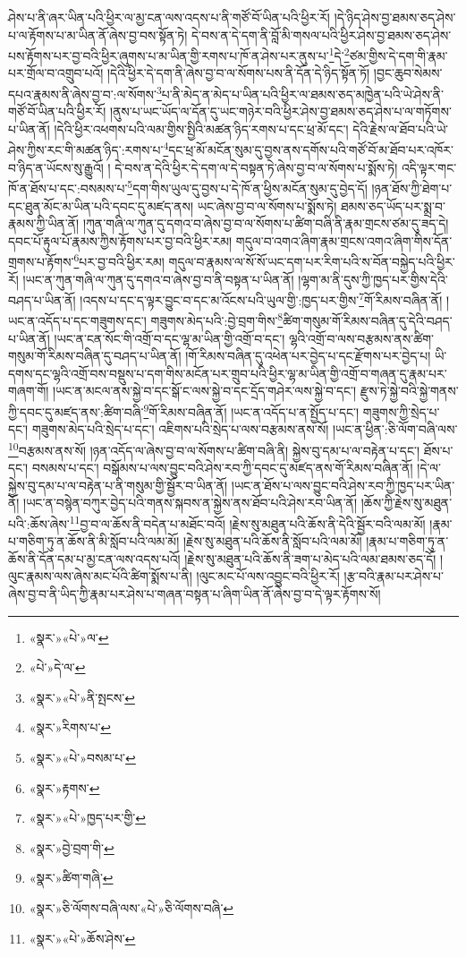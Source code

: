 ཤེས་པ་ནི་ཞར་ཡིན་པའི་ཕྱིར་ལ་མྱ་ངན་ལས་འདས་པ་ནི་གཙོ་བོ་ཡིན་པའི་ཕྱིར་རོ། །དེ་ཉིད་ཤེས་བྱ་ཐམས་ཅད་ཤེས་པ་ལ་རྟོགས་པ་མ་ཡིན་ནོ་ཞེས་བྱ་བས་སྟོན་ཏེ། དེ་བས་ན་དེ་དག་ནི་བློ་མི་གསལ་པའི་ཕྱིར་ཤེས་བྱ་ཐམས་ཅད་ཤེས་པས་རྟོགས་པར་བྱ་བའི་ཕྱིར་ཞུགས་པ་མ་ཡིན་གྱི་རགས་པ་ཁོ་ན་ཤེས་པར་ནུས་པ་\footnote{«སྣར་»«པེ་»ལ་}དེ་\footnote{«པེ་»དེ་ལ་}ཙམ་གྱིས་དེ་དག་གི་རྣམ་པར་གྲོལ་བ་འགྲུབ་པའོ། །དེའི་ཕྱིར་དེ་དག་ནི་ཞེས་བྱ་བ་ལ་སོགས་པས་ནི་དོན་དེ་ཉིད་སྟོན་ཏོ། །བྱང་ཆུབ་སེམས་དཔའ་རྣམས་ནི་ཞེས་བྱ་བ་:ལ་སོགས་\footnote{«སྣར་»«པེ་»ནི་སྤངས་}པ་ནི་མེད་ན་མེད་པ་ཡིན་པའི་ཕྱིར་ལ་ཐམས་ཅད་མཁྱེན་པའི་ཡེ་ཤེས་ནི་གཙོ་བོ་ཡིན་པའི་ཕྱིར་རོ། །ནུས་པ་ཡང་ཡོད་ལ་དོན་དུ་ཡང་གཉེར་བའི་ཕྱིར་ཤེས་བྱ་ཐམས་ཅད་ཤེས་པ་ལ་གཏོགས་པ་ཡིན་ནོ། །དེའི་ཕྱིར་འཕགས་པའི་ལམ་གྱིས་སྤྱིའི་མཚན་ཉིད་རགས་པ་དང་ཕྲ་མོ་དང་། དེའི་རྗེས་ལ་ཐོབ་པའི་ཡེ་ཤེས་ཀྱིས་རང་གི་མཚན་ཉིད་:རགས་པ་\footnote{«སྣར་»རིགས་པ་}དང་ཕྲ་མོ་མངོན་སུམ་དུ་བྱས་ནས་དགོས་པའི་གཙོ་བོ་མ་ཐོབ་པར་འཁོར་བ་ཉིད་ན་ཡོངས་སུ་རྒྱུའོ། །
དེ་བས་ན་དེའི་ཕྱིར་དེ་དག་ལ་དེ་བསྟན་ཏེ་ཞེས་བྱ་བ་ལ་སོགས་པ་སྨོས་ཏེ། འདི་ལྟར་གང་ཁོ་ན་ཐོས་པ་དང་:བསམས་པ་\footnote{«སྣར་»«པེ་»བསམ་པ་}དག་གིས་ཡུལ་དུ་བྱས་པ་དེ་ཁོ་ན་ཕྱིས་མངོན་སུམ་དུ་བྱེད་དོ། །ཉན་ཐོས་ཀྱི་ཐེག་པ་དང་ཐུན་མོང་མ་ཡིན་པའི་དབང་དུ་མཛད་ནས། ཡང་ཞེས་བྱ་བ་ལ་སོགས་པ་སྨོས་ཏེ། ཐམས་ཅད་ཡོད་པར་སྨྲ་བ་རྣམས་ཀྱི་ཡིན་ནོ། །ཀུན་གཞི་ལ་ཀུན་དུ་དགའ་བ་ཞེས་བྱ་བ་ལ་སོགས་པ་ཚིག་བཞི་ནི་རྣམ་གྲངས་ཙམ་དུ་ཟད་དེ། དབང་པོ་རྟུལ་པོ་རྣམས་ཀྱིས་རྟོགས་པར་བྱ་བའི་ཕྱིར་རམ། གདུལ་བ་འགའ་ཞིག་རྣམ་གྲངས་འགའ་ཞིག་གིས་དོན་གྲགས་པ་རྟོགས་\footnote{«སྣར་»རྟགས་}པར་བྱ་བའི་ཕྱིར་རམ། གདུལ་བ་རྣམས་ལ་སོ་སོ་ཡང་དག་པར་རིག་པའི་ས་བོན་བསྐྱེད་པའི་ཕྱིར་རོ། །ཡང་ན་ཀུན་གཞི་ལ་ཀུན་དུ་དགའ་བ་ཞེས་བྱ་བ་ནི་བསྟན་པ་ཡིན་ནོ། །ལྷག་མ་ནི་དུས་ཀྱི་ཁྱད་པར་གྱིས་དེའི་བཤད་པ་ཡིན་ནོ། །འདས་པ་དང་ད་ལྟར་བྱུང་བ་དང་མ་འོངས་པའི་ཡུལ་གྱི་:ཁྱད་པར་གྱིས་\footnote{«སྣར་»«པེ་»ཁྱད་པར་གྱི་}གོ་རིམས་བཞིན་ནོ། །ཡང་ན་འདོད་པ་དང་གཟུགས་དང་། གཟུགས་མེད་པའི་:བྱེ་བྲག་གིས་\footnote{«སྣར་»བྱེ་བྲག་གི་}ཚིག་གསུམ་གོ་རིམས་བཞིན་དུ་དེའི་བཤད་པ་ཡིན་ནོ། །ཡང་ན་ངན་སོང་གི་འགྲོ་བ་དང་ལྷ་མ་ཡིན་གྱི་འགྲོ་བ་དང་། ལྷའི་འགྲོ་བ་ལས་བརྩམས་ནས་ཚིག་གསུམ་གོ་རིམས་བཞིན་དུ་བཤད་པ་ཡིན་ནོ། །གོ་རིམས་བཞིན་དུ་འཕེན་པར་བྱེད་པ་དང་རྫོགས་པར་བྱེད་པ། ཡི་དགས་དང་ལྷའི་འགྲོ་བས་བསྡུས་པ་དག་གིས་མངོན་པར་གྲུབ་པའི་ཕྱིར་ལྷ་མ་ཡིན་གྱི་འགྲོ་བ་གཞན་དུ་རྣམ་པར་གཞག་གོ། །ཡང་ན་མངལ་ནས་སྐྱེ་བ་དང་སྒོ་ང་ལས་སྐྱེ་བ་དང་དྲོད་གཤེར་ལས་སྐྱེ་བ་དང་། རྫུས་ཏེ་སྐྱེ་བའི་སྐྱེ་གནས་ཀྱི་དབང་དུ་མཛད་ནས་:ཚིག་བཞི་\footnote{«སྣར་»ཚིག་གཞི་}གོ་རིམས་བཞིན་ནོ། །ཡང་ན་འདོད་པ་ན་སྤྱོད་པ་དང་། གཟུགས་ཀྱི་སྲེད་པ་དང་། གཟུགས་མེད་པའི་སྲེད་པ་དང་། འཇིགས་པའི་སྲེད་པ་ལས་བརྩམས་ནས་སོ། །ཡང་ན་ཕྱིན་:ཅི་ལོག་བཞི་ལས་\footnote{«སྣར་»ཅི་ལོགས་བཞི་ལས་«པེ་»ཅི་ལོགས་བཞི་}བརྩམས་ནས་སོ། །ཉན་འདོད་ལ་ཞེས་བྱ་བ་ལ་སོགས་པ་ཚིག་བཞི་ནི། སྐྱེས་བུ་དམ་པ་ལ་བརྟེན་པ་དང་། ཐོས་པ་དང་། བསམས་པ་དང་། བསྒོམས་པ་ལས་བྱུང་བའི་ཤེས་རབ་ཀྱི་དབང་དུ་མཛད་ནས་གོ་རིམས་བཞིན་ནོ། །དེ་ལ་སྐྱེས་བུ་དམ་པ་ལ་བརྟེན་པ་ནི་གསུམ་གྱི་སྦྱོར་བ་ཡིན་ནོ། །ཡང་ན་ཐོས་པ་ལས་བྱུང་བའི་ཤེས་རབ་ཀྱི་ཁྱད་པར་ཡིན་ནོ། །ཡང་ན་བསྙེན་བཀུར་བྱེད་པའི་གནས་སྐབས་ན་སྐྱེས་ནས་ཐོབ་པའི་ཤེས་རབ་ཡིན་ནོ། །ཆོས་ཀྱི་རྗེས་སུ་མཐུན་པའི་:ཆོས་ཞེས་\footnote{«སྣར་»«པེ་»ཆོས་ཤེས་}བྱ་བ་ལ་ཆོས་ནི་བདེན་པ་མཐོང་བའོ། །རྗེས་སུ་མཐུན་པའི་ཆོས་ནི་དེའི་སྦྱོར་བའི་ལམ་མོ། །རྣམ་པ་གཅིག་ཏུ་ན་ཆོས་ནི་མི་སློབ་པའི་ལམ་མོ། །རྗེས་སུ་མཐུན་པའི་ཆོས་ནི་སློབ་པའི་ལམ་མོ། །རྣམ་པ་གཅིག་ཏུ་ན་ཆོས་ནི་དོན་དམ་པ་མྱ་ངན་ལས་འདས་པའོ། །རྗེས་སུ་མཐུན་པའི་ཆོས་ནི་ཟག་པ་མེད་པའི་ལམ་ཐམས་ཅད་དོ། །ལུང་རྣམས་ལས་ཞེས་མང་པོའི་ཚིག་སྨོས་པ་ནི། །ལུང་མང་པོ་ལས་འབྱུང་བའི་ཕྱིར་རོ། །རྩ་བའི་རྣམ་པར་ཤེས་པ་ཞེས་བྱ་བ་ནི་ཡིད་ཀྱི་རྣམ་པར་ཤེས་པ་གཞན་བསྟན་པ་ཞིག་ཡིན་ནོ་ཞེས་བྱ་བ་དེ་ལྟར་རྟོགས་སོ། 